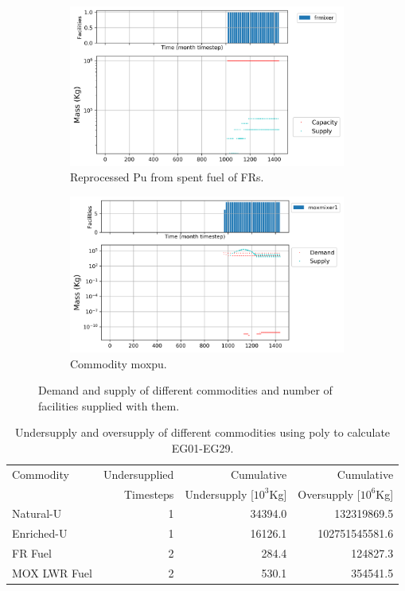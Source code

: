 \documentclass[11pt]{article}
\begin{document}
\begin{figure}[H]
	\centering
	\begin{subfigure}[t]{0.45\textwidth}
		\centering
		\includegraphics[width=\linewidth]{23-figures/0-poly-frpu.png} 
		\caption{Reprocessed Pu from spent fuel of FRs.}
		\label{fig:29-frpu}
	\end{subfigure}
	\vspace{1cm}
	\begin{subfigure}[t]{0.45\textwidth}
		\centering
		\includegraphics[width=\linewidth]{29-figures/0-poly-moxpu.png} 
		\caption{Commodity moxpu.}
		\label{fig:29-moxpu}
	\end{subfigure}
	\hfill
	\caption{Demand and supply of different commodities and number of facilities supplied with them.}
	\label{fig:29-pu2}
\end{figure}

\begin{table}[H]
	\centering
	\caption{Undersupply and oversupply of different commodities using poly to calculate EG01-EG29.}
	\label{tab:29-commod}
	\begin{tabularx}{\textwidth}{lRRR}
		\hline
		Commodity & Undersupplied & Cumulative  & Cumulative \\
		& Timesteps & Undersupply [$10^3$Kg]  & Oversupply [$10^6$Kg] \\ \hline
		Natural-U & 1 & 34394.0  & 132319869.5 \\ 
		Enriched-U & 1 & 16126.1 & 102751545581.6 \\
		FR Fuel & 2 & 284.4 & 124827.3 \\
        MOX LWR Fuel & 2 & 530.1 & 354541.5 \\ \hline
	\end{tabularx}
\end{table}
\end{document}
